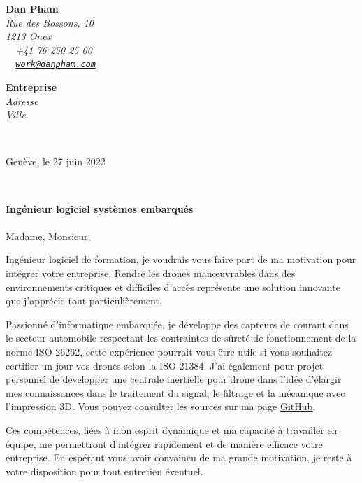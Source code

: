 \documentclass[11pt]{article}
\begin{document}
\sffamily   %
\hfill%
\begin{flushleft}
{\bfseries Dan Pham}\\[.35ex]
{\small\itshape
Rue des Bossons, 10\\
1213 Onex\\[.35ex]
~\raisebox{-0.3ex}{\faPhone}~+41 76 250 25 00\\
~\raisebox{-0.1ex}{\faEnvelopeO}~\texttt{\href{mailto:Dan\%20Pham<work@danpham.com>?subject=Contact}{work@danpham.com}}
}\\[3em]

\begin{flushright}

\begin{minipage}[t]{.4\textwidth}
\raggedright
{\bfseries Entreprise}\\[.35ex]
{\small\itshape
Adresse \\
Ville \\}
\end{minipage}\\[2em]

\end{flushright}
\end{flushleft}

\hfill %
\begin{minipage}[t]{.4\textwidth}
        Genève, le 27 juin 2022
\end{minipage}\\[8em]
\raggedright
\textbf{Ingénieur logiciel systèmes embarqués} \\[2em]
\paragraph{}
Madame, Monsieur,
\par
\hspace{0.4cm}Ingénieur logiciel de formation, je voudrais vous faire part de ma motivation pour intégrer votre entreprise. Rendre les drones manœuvrables dans des environnements critiques et difficiles d’accès représente une solution innovante que j’apprécie tout particulièrement.
\par
\hspace{0.4cm}Passionné d’informatique embarquée, je développe des capteurs de courant dans le secteur automobile respectant les contraintes de sûreté de fonctionnement de la norme ISO 26262, cette expérience pourrait vous être utile si vous souhaitez certifier un jour vos drones selon la ISO 21384. J’ai également pour
projet personnel de développer une centrale inertielle pour drone dans l’idée d’élargir mes connaissances dans le traitement du signal, le filtrage et la mécanique avec l’impression 3D. Vous pouvez consulter les sources sur ma page \href{https://github.com/danpham}{GitHub}.
\par
\hspace{0.4cm}Ces compétences, liées à mon esprit dynamique et ma capacité à travailler en équipe, me permettront d’intégrer rapidement et de manière efficace votre entreprise. En espérant vous avoir convaincu de ma grande motivation, je reste à votre disposition pour tout entretien éventuel.
\end{document}
